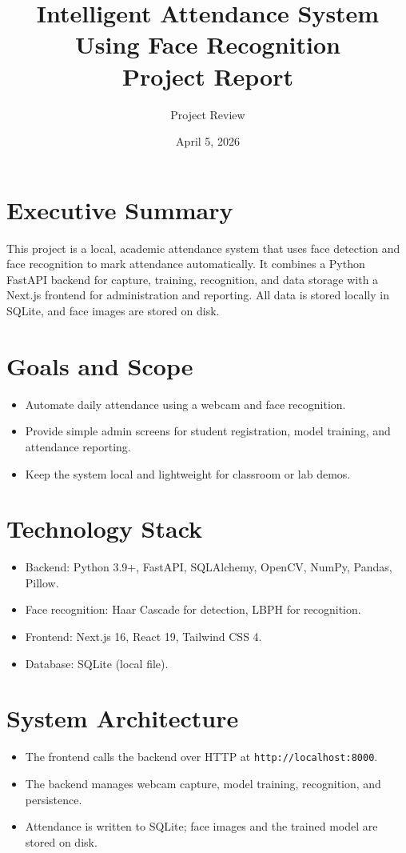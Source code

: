 \documentclass[11pt]{article}
\title{Intelligent Attendance System Using Face Recognition\\Project Report}
\author{Project Review}
\date{April 5, 2026}
\begin{document}
\maketitle

\section*{Executive Summary}
This project is a local, academic attendance system that uses face detection and face recognition to mark attendance automatically. It combines a Python FastAPI backend for capture, training, recognition, and data storage with a Next.js frontend for administration and reporting. All data is stored locally in SQLite, and face images are stored on disk.

\section*{Goals and Scope}
\begin{itemize}[leftmargin=*]
  \item Automate daily attendance using a webcam and face recognition.
  \item Provide simple admin screens for student registration, model training, and attendance reporting.
  \item Keep the system local and lightweight for classroom or lab demos.
\end{itemize}

\section*{Technology Stack}
\begin{itemize}[leftmargin=*]
  \item Backend: Python 3.9+, FastAPI, SQLAlchemy, OpenCV, NumPy, Pandas, Pillow.
  \item Face recognition: Haar Cascade for detection, LBPH for recognition.
  \item Frontend: Next.js 16, React 19, Tailwind CSS 4.
  \item Database: SQLite (local file).
\end{itemize}

\section*{System Architecture}
\begin{itemize}[leftmargin=*]
  \item The frontend calls the backend over HTTP at \texttt{http://localhost:8000}.
  \item The backend manages webcam capture, model training, recognition, and persistence.
  \item Attendance is written to SQLite; face images and the trained model are stored on disk.
\end{itemize}
\end{document}
